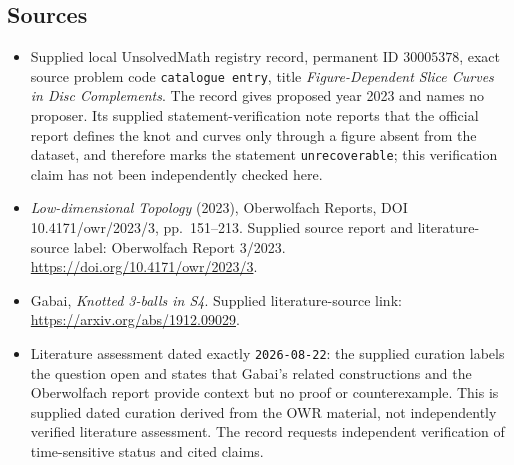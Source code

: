 \documentclass[11pt]{article}
\begin{document}
\subsection{Sources}
\begin{itemize}
\item Supplied local UnsolvedMath registry record, permanent ID \(30005378\), exact source problem code \texttt{catalogue entry}, title \emph{Figure-Dependent Slice Curves in Disc Complements}. The record gives proposed year 2023 and names no proposer. Its supplied statement-verification note reports that the official report defines the knot and curves only through a figure absent from the dataset, and therefore marks the statement \texttt{unrecoverable}; this verification claim has not been independently checked here.
\item \emph{Low-dimensional Topology} (2023), Oberwolfach Reports, DOI 10.4171/owr/2023/3, pp.\ 151--213. Supplied source report and literature-source label: Oberwolfach Report 3/2023. \url{https://doi.org/10.4171/owr/2023/3}.
\item Gabai, \emph{Knotted 3-balls in S4}. Supplied literature-source link: \url{https://arxiv.org/abs/1912.09029}.
\item Literature assessment dated exactly \texttt{2026-08-22}: the supplied curation labels the question open and states that Gabai's related constructions and the Oberwolfach report provide context but no proof or counterexample. This is supplied dated curation derived from the OWR material, not independently verified literature assessment. The record requests independent verification of time-sensitive status and cited claims.
\end{itemize}
\end{document}
